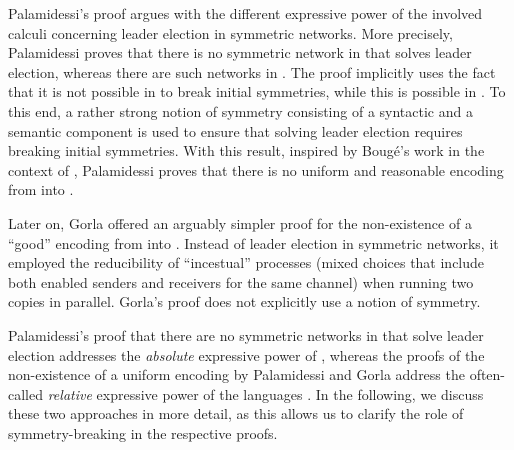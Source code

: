 \documentclass[11pt,techReport]{eptcs}
\begin{document}
Palamidessi's proof \cite{palamidessi03} argues with the different expressive power of the involved calculi concerning leader election in symmetric networks.  More precisely, Palamidessi proves that there is no symmetric network in \pisep that solves leader election, whereas there are such networks in \pimix. The proof implicitly uses the fact that it is not possible in \pisep to break initial symmetries, while this is possible in \pimix.  To this end, a rather strong notion of symmetry consisting of a syntactic and a semantic component is used to ensure that solving leader election requires breaking initial symmetries. With this result, inspired by Boug{\'e}'s work \cite{bouge88} in the context of \csp, Palamidessi proves that there is no uniform and reasonable encoding from \pimix into \pisep.

Later on, Gorla \cite{gorla08d} offered an arguably simpler proof for the non-existence of a ``good'' encoding from \pimix into \pisep. Instead of leader election in symmetric networks, it employed the reducibility of ``incestual'' processes (mixed choices that include both enabled senders and receivers for the same channel) when running two copies in parallel. Gorla's proof does not explicitly use a notion of symmetry.

Palamidessi's proof that there are no symmetric networks in \pisep that solve leader election addresses the \emph{absolute} expressive power of \pisep, whereas the proofs of the non-existence of a uniform encoding by Palamidessi and Gorla address the often-called \emph{relative} expressive power of the languages \cite{parrow08}. In the following, we discuss these two approaches in more detail, as this allows us to clarify the role of symmetry-breaking in the respective proofs.
\end{document}
